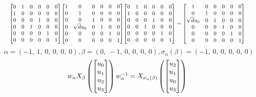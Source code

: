 \documentclass[11pt]{article}
\theoremstyle{definition}
\begin{document}
\[
\scaletoalign{\textwidth}{{\left[\begin{matrix}0 & 1 & 0 & 0 & 0 & 0\\1 & 0 & 0 & 0 & 0 & 0\\0 & 0 & 0 & 1 & 0 & 0\\0 & 0 & 1 & 0 & 0 & 0\\0 & 0 & 0 & 0 & 1 & 0\\0 & 0 & 0 & 0 & 0 & 1\end{matrix}\right]} {\left[\begin{matrix}1 & 0 & 0 & 0 & 0 & 0\\0 & 1 & 0 & 0 & 0 & 0\\0 & 0 & 1 & 0 & 0 & 0\\0 & \sqrt{d} u_{0} & 0 & 1 & 0 & 0\\0 & 0 & 0 & 0 & 1 & 0\\0 & 0 & 0 & 0 & 0 & 1\end{matrix}\right]} {\left[\begin{matrix}0 & 1 & 0 & 0 & 0 & 0\\1 & 0 & 0 & 0 & 0 & 0\\0 & 0 & 0 & 1 & 0 & 0\\0 & 0 & 1 & 0 & 0 & 0\\0 & 0 & 0 & 0 & 1 & 0\\0 & 0 & 0 & 0 & 0 & 1\end{matrix}\right]} = {\left[\begin{matrix}1 & 0 & 0 & 0 & 0 & 0\\0 & 1 & 0 & 0 & 0 & 0\\\sqrt{d} u_{0} & 0 & 1 & 0 & 0 & 0\\0 & 0 & 0 & 1 & 0 & 0\\0 & 0 & 0 & 0 & 1 & 0\\0 & 0 & 0 & 0 & 0 & 1\end{matrix}\right]}}
\]
\[
\alpha = \left( -1, \  1, \  0, \  0, \  0, \  0\right), \beta = \left( 0, \  -1, \  0, \  0, \  0, \  0\right), \sigma_{\alpha}(\beta) = \left( -1, \  0, \  0, \  0, \  0, \  0\right)
\]
\[
\scaletoalign{\textwidth}{w_{\alpha} X_{\beta}\left(\left[\begin{matrix}u_{0}\\u_{1}\\u_{2}\\u_{3}\end{matrix}\right]\right) w_{\alpha}^{-1} = X_{\sigma_{\alpha}\left(\beta\right)}\left(\left[\begin{matrix}u_{2}\\u_{1}\\u_{0}\\u_{3}\end{matrix}\right]\right)}
\]
\end{document}
